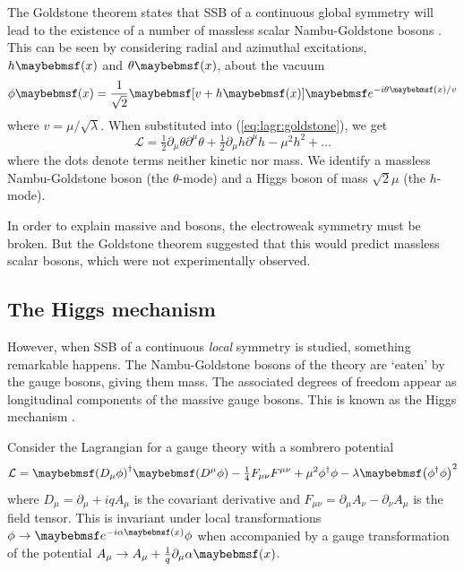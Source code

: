 The Goldstone theorem states that SSB of a continuous global symmetry will lead to 
the existence of a number of massless scalar Nambu-Goldstone bosons \cite{Goldstone:1962}.
This can be seen by considering radial and azimuthal excitations, $h\parenths{x}$ and 
$\theta\parenths{x}$, about the vacuum 
\begin{equation}
	\phi\parenths{x} = \frac{1}{\sqrt{2}} \sqbracs{v + h\parenths{x}} \eexp{-i\theta\parenths{x} / v}
\end{equation}
where $v = \mu/\sqrt{\lambda}$. When substituted into (\ref{eq:lagr:goldstone}), we get
\begin{equation}
	\mathcal{L} = \tfrac{1}{2}\partial_{\mu}\theta \partial^{\mu}\theta
	+ \tfrac{1}{2}\partial_{\mu}h \partial^{\mu}h
	- \mu^2 h^2
	+ \dots
\end{equation}
where the dots denote terms neither kinetic nor mass. 
We identify a massless Nambu-Goldstone boson (the $\theta$-mode) and a Higgs boson of 
mass $\sqrt{2}\mu$ (the $h$-mode).

In order to explain massive \PWpm and \PZ bosons, the electroweak symmetry must be broken.
But the Goldstone theorem suggested that this would predict massless scalar bosons, which
were not experimentally observed.



\subsection{The Higgs mechanism}
\label{sec:ewsb:higgs}
However, when SSB of a continuous \textit{local} symmetry is studied, something 
remarkable happens. The Nambu-Goldstone bosons of the theory are `eaten' by the gauge 
bosons, giving them mass. The associated degrees of freedom appear as longitudinal 
components of the massive gauge bosons. This is known as the Higgs mechanism 
\cite{Englert:1964,Higgs:1964a,Higgs:1964b,Guralnik:1964,Higgs:1966}.

Consider the Lagrangian for a  gauge theory with a sombrero potential
\begin{equation}
	\mathcal{L} 
	= \parenths{D_{\mu}\phi}^{\dagger} \parenths{D^{\mu}\phi}
	- \tfrac{1}{4} F_{\mu\nu} F^{\mu\nu}
	+ \mu^2 \phi^{\dagger} \phi - \lambda \parenths{\phi^{\dagger} \phi}^2
	\label{eq:lagr:abelHiggs}
\end{equation}
where $D_{\mu} = \partial_{\mu} + iqA_{\mu}$ is the covariant derivative and $F_{\mu\nu} 
= \partial_{\mu}A_{\nu} - \partial_{\nu}A_{\mu}$ is the field tensor. This is invariant 
under local  transformations $\phi \rightarrow \eexp{-i\alpha\parenths{x}} \phi$
when accompanied by a gauge transformation of the potential 
$A_{\mu} \rightarrow A_{\mu} + \tfrac{1}{q}\partial_{\mu} \alpha\parenths{x}$.

